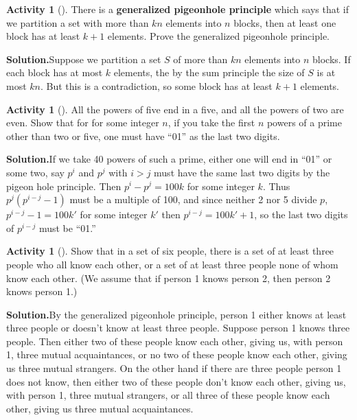 \documentclass[10pt,]{book}
\newcommand{\terminology}[1]{\textbf{#1}}
\theoremstyle{plain}
\theoremstyle{definition}
\newtheorem{activity}[project]{Activity}
\numberwithin{equation}{chapter}
\begin{document}
\begin{activity}[]\label{activity-63}
There is a \terminology{generalized pigeonhole principle} which says that if we partition a set with more than \(kn\) elements into \(n\) blocks, then at least one block has at least \(k+1\) elements. Prove the generalized pigeonhole principle.%
\par\medskip\noindent%
\textbf{Solution.}\quad Suppose we partition a set \(S\) of more than \(kn\) elements into \(n\) blocks. If each block has at most \(k\) elements, the by the sum principle the size of \(S\) is at most \(kn\). But this is a contradiction, so some block has at least \(k+1\) elements.%
\end{activity}
\begin{activity}[]\label{activity-64}
All the powers of five end in a five, and all the powers of two are even. Show that for for some integer \(n\), if you take the first \(n\) powers of a prime other than two or five, one must have ``01'' as the last two digits.%
\par\medskip\noindent%
\textbf{Solution.}\quad If we take 40 powers of such a prime, either one will end in ``01'' or some two, say \(p^i\) and \(p^j\) with \(i>j\) must have the same last two digits by the pigeon hole principle. Then \(p^i-p^j=100k\) for some integer \(k\). Thus \(p^j(p^{i-j} -1)\) must be a multiple of 100, and since neither 2 nor 5 divide \(p\), \(p^{i-j} -1 = 100k'\) for some integer \(k'\) then \(p^{i-j} = 100k'+1\), so the last two digits of \(p^{i-j}\) must be ``01.''%
\end{activity}
\begin{activity}[]\label{R_3_3_}
Show that in a set of six people, there is a set of at least three people who all know each other, or a set of at least three people none of whom know each other. (We assume that if person 1 knows person 2, then person 2 knows person 1.)%
\par\medskip\noindent%
\textbf{Solution.}\quad By the generalized pigeonhole principle, person 1 either knows at least three people or doesn't know at least three people. Suppose person 1 knows three people. Then either two of these people know each other, giving us, with person 1, three mutual acquaintances, or no two of these people know each other, giving us three mutual strangers. On the other hand if there are three people person 1 does not know, then either two of these people don't know each other, giving us, with person 1, three mutual strangers, or all three of these people know each other, giving us three mutual acquaintances.%
\end{activity}
\end{document}
